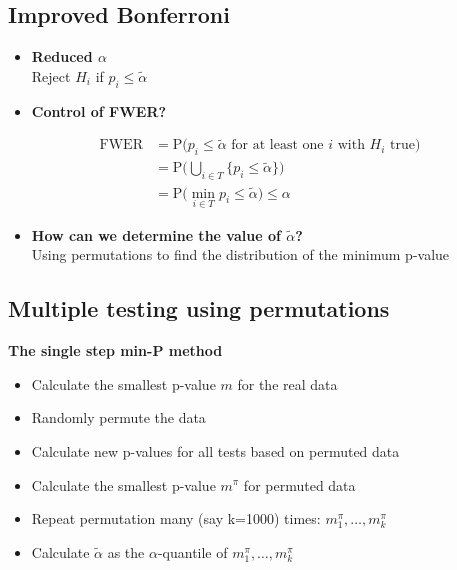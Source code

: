 \documentclass[
]{article}
\providecommand{\tightlist}{%
  \setlength{\itemsep}{0pt}\setlength{\parskip}{0pt}}
\begin{document}
\hypertarget{improved-bonferroni}{%
\subsection{Improved Bonferroni}\label{improved-bonferroni}}

\begin{itemize}
\tightlist
\item
  \textbf{Reduced \(\alpha\)}\\
  Reject \(H_i\) if \(p_i \leq \tilde\alpha\)
\item
  \textbf{Control of FWER?}
\end{itemize}

\[
\begin{aligned}
\mathrm{FWER} &= \mathrm{P} \big(\textrm{$p_i \leq \tilde\alpha$ for at least one $i$ with $H_i$ true} \big) \\
    &= \mathrm{P} \Big( \bigcup_{i\in T} \{p_i \leq \tilde\alpha\} \Big) \\
    &= \mathrm{P} \Big( \min_{i \in T} p_i \leq \tilde\alpha \Big) \leq \alpha
\end{aligned}
\]

\begin{itemize}
\tightlist
\item
  \textbf{How can we determine the value of \(\tilde \alpha\)?}\\
  Using permutations to find the distribution of the minimum p-value
\end{itemize}

\hypertarget{multiple-testing-using-permutations}{%
\subsection{Multiple testing using
permutations}\label{multiple-testing-using-permutations}}

\textbf{The single step min-P method}

\begin{itemize}
\tightlist
\item
  Calculate the smallest p-value \(m\) for the real data\\
\item
  Randomly permute the data\\
\item
  Calculate new p-values for all tests based on permuted data\\
\item
  Calculate the smallest p-value \(m^\pi\) for permuted data\\
\item
  Repeat permutation many (say k=1000) times:
  \(m^\pi_1, \ldots, m^\pi_k\)\\
\item
  Calculate \(\tilde\alpha\) as the \(\alpha\)-quantile of
  \(m^\pi_1, \ldots, m^\pi_k\)
\end{itemize}
\end{document}
